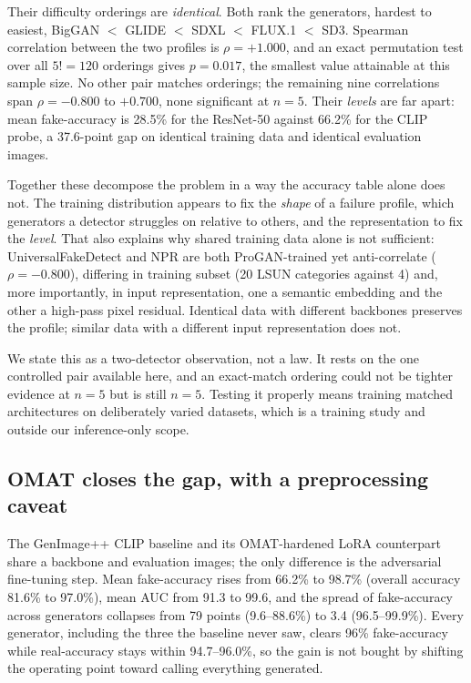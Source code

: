 \documentclass[3p,times,procedia]{elsarticle}
\begin{document}
Their difficulty orderings are \emph{identical}. Both rank the generators,
hardest to easiest, BigGAN $<$ GLIDE $<$ SDXL $<$ FLUX.1 $<$ SD3. Spearman
correlation between the two profiles is $\rho=+1.000$, and an exact
permutation test over all $5!=120$ orderings gives $p=0.017$, the smallest
value attainable at this sample size. No other pair matches orderings; the
remaining nine correlations span $\rho=-0.800$ to $+0.700$, none
significant at $n=5$. Their \emph{levels} are far apart: mean
fake-accuracy is 28.5\% for the ResNet-50 against 66.2\% for the CLIP
probe, a 37.6-point gap on identical training data and identical
evaluation images.

Together these decompose the problem in a way the accuracy table alone
does not. The training distribution appears to fix the \emph{shape} of a
failure profile, which generators a detector struggles on relative to
others, and the representation to fix the \emph{level}. That also explains
why shared training data alone is not sufficient: UniversalFakeDetect and
NPR are both ProGAN-trained yet anti-correlate ($\rho=-0.800$), differing
in training subset (20 LSUN categories against 4) and, more importantly, in
input representation, one a semantic embedding and the other a high-pass
pixel residual. Identical data with different backbones preserves the
profile; similar data with a different input representation does not.

We state this as a two-detector observation, not a law. It rests on the one
controlled pair available here, and an exact-match ordering could not be
tighter evidence at $n=5$ but is still $n=5$. Testing it properly means
training matched architectures on deliberately varied datasets, which is a
training study and outside our inference-only scope.

\subsection{OMAT closes the gap, with a preprocessing caveat}
\label{sec:finding2}

The GenImage++ CLIP baseline and its OMAT-hardened LoRA counterpart share a
backbone and evaluation images; the only difference is the adversarial
fine-tuning step. Mean fake-accuracy rises from 66.2\% to 98.7\% (overall
accuracy 81.6\% to 97.0\%), mean AUC from 91.3 to 99.6, and the spread of
fake-accuracy across generators collapses from 79 points (9.6--88.6\%) to
3.4 (96.5--99.9\%). Every generator, including the three the baseline never
saw, clears 96\% fake-accuracy while real-accuracy stays within
94.7--96.0\%, so the gain is not bought by shifting the operating point
toward calling everything generated.
\end{document}
